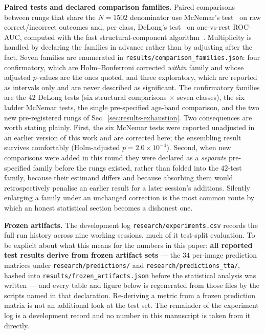 \documentclass[journal]{IEEEtran}
\begin{document}
\textbf{Paired tests and declared comparison families.} Paired comparisons between rungs that
share the $N=1502$ denominator use McNemar's test~\cite{dietterich1998} on raw
correct/incorrect outcomes and, per class, DeLong's test~\cite{delong1988} on one-vs-rest
ROC-AUC, computed with the fast structural-component algorithm~\cite{sun2014fastdelong}.
Multiplicity is handled by declaring the families in advance rather than by adjusting after
the fact. Seven families are enumerated in
\texttt{results/comparison\_families.json}: four confirmatory, which are Holm--Bonferroni
corrected \emph{within} family and whose adjusted $p$-values are the ones quoted, and three
exploratory, which are reported as intervals only and are never described as significant.
The confirmatory families are the $42$ DeLong tests (six structural comparisons $\times$ seven
classes), the six ladder McNemar tests, the single pre-specified age-band comparison, and the
two new pre-registered rungs of Sec.~\ref{sec:results-exhaustion}. Two consequences are worth
stating plainly. First, the six McNemar tests were reported unadjusted in an earlier version
of this work and are corrected here; the ensembling result survives comfortably (Holm-adjusted
$p = 2.0\times10^{-4}$). Second, when new comparisons were added in this round they were
declared as a \emph{separate} pre-specified family before the rungs existed, rather than
folded into the $42$-test family, because their estimand differs and because absorbing them
would retrospectively penalise an earlier result for a later session's additions. Silently
enlarging a family under an unchanged correction is the most common route by which an honest
statistical section becomes a dishonest one.

\textbf{Frozen artifacts.} The development log \texttt{research/experiments.csv} records the
full run history across nine working sessions, much of it test-split evaluation. To be
explicit about what this means for the numbers in this paper: \textbf{all reported test
results derive from frozen artifact sets} --- the $34$ per-image prediction matrices under
\texttt{research/predictions/} and \texttt{research/predictions\_tta/}, hashed into
\texttt{results/frozen\_artifacts.json} before the statistical analysis was written --- and
every table and figure below is regenerated from those files by the scripts named in that
declaration. Re-deriving a metric from a frozen prediction matrix is not an additional look
at the test set. The remainder of the experiment log is a development record and no number in
this manuscript is taken from it directly.
\end{document}
